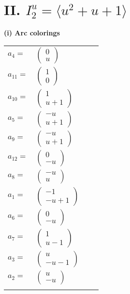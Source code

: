 \documentclass[1p]{elsarticle_modified}
\theoremstyle{definition}
\begin{document}
\centering \section*{II. $I^u_{2}= \langle u^2+u+1 \rangle$}
\flushleft \textbf{(i) Arc colorings}\\
\begin{tabular}{m{7pt} m{180pt} m{7pt} m{180pt} }
\flushright $a_{4}=$&$\begin{pmatrix}0\\u\end{pmatrix}$ \\
\flushright $a_{11}=$&$\begin{pmatrix}1\\0\end{pmatrix}$ \\
\flushright $a_{10}=$&$\begin{pmatrix}1\\u+1\end{pmatrix}$ \\
\flushright $a_{5}=$&$\begin{pmatrix}- u\\u+1\end{pmatrix}$ \\
\flushright $a_{9}=$&$\begin{pmatrix}- u\\u+1\end{pmatrix}$ \\
\flushright $a_{12}=$&$\begin{pmatrix}0\\- u\end{pmatrix}$ \\
\flushright $a_{8}=$&$\begin{pmatrix}- u\\u\end{pmatrix}$ \\
\flushright $a_{1}=$&$\begin{pmatrix}-1\\- u+1\end{pmatrix}$ \\
\flushright $a_{6}=$&$\begin{pmatrix}0\\- u\end{pmatrix}$ \\
\flushright $a_{7}=$&$\begin{pmatrix}1\\u-1\end{pmatrix}$ \\
\flushright $a_{3}=$&$\begin{pmatrix}u\\- u-1\end{pmatrix}$ \\
\flushright $a_{2}=$&$\begin{pmatrix}u\\- u\end{pmatrix}$\\&\end{tabular}
\end{document}
